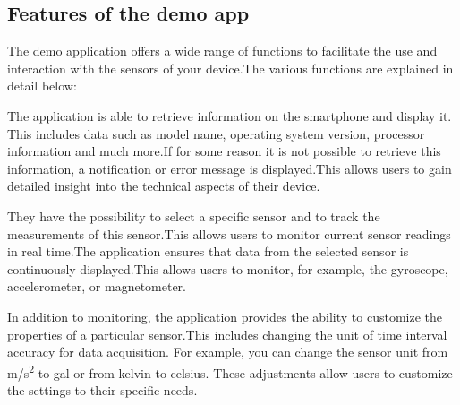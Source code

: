 \documentclass[12pt]{article}
\newcounter{fr}
\begin{document}
\subsection{Features of the demo app}
    The demo application offers a wide range of functions to facilitate the use and interaction with the sensors of your device.The various functions are explained in detail below: 
\begin{itemize}
    
    \item[1.]
    
    \begin{minipage}[t]{0.6\textwidth}
        The application is able to retrieve information on the smartphone and display it. This includes data such as model name, operating system version, processor information and much more.If for some reason it is not possible to retrieve this information, a notification or error message is displayed.This allows users to gain detailed insight into the technical aspects of their device. 
     \item[2.] They have the possibility to select a specific sensor and to track the measurements of this sensor.This allows users to monitor current sensor readings in real time.The application ensures that data from the selected sensor is continuously displayed.This allows users to monitor, for example, the gyroscope, accelerometer, or magnetometer.  
    \item[3.] In addition to monitoring, the application provides the ability to customize the properties of a particular sensor.This includes changing the unit of time interval accuracy for data acquisition. For example, you can change the sensor unit from  m/s\textsuperscript{2} to gal or from kelvin to celsius. These adjustments allow users to customize the settings to their specific needs. 
    \end{minipage} 
    \hfill
     \begin{minipage}[t]{0.3\textwidth}
        \vspace{-\baselineskip}

\end{minipage}
\end{itemize}
\end{document}
